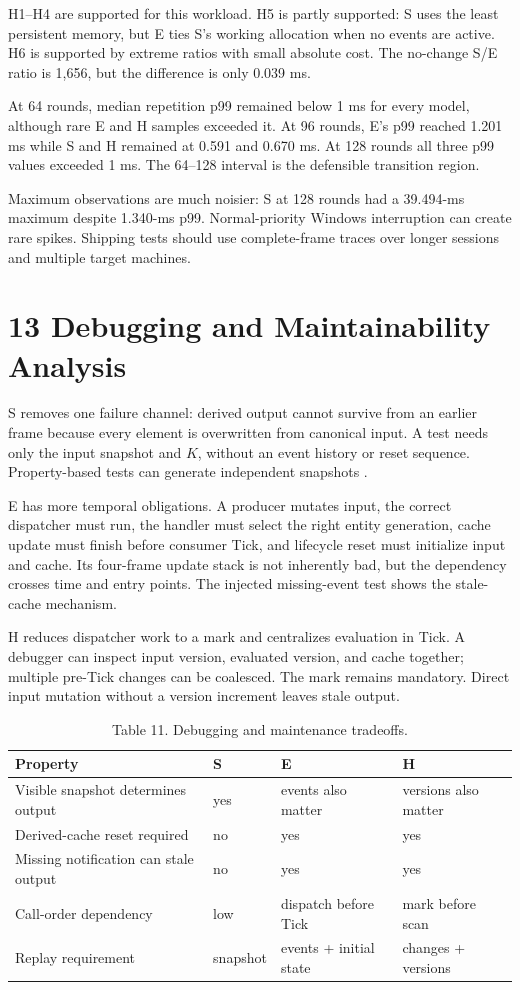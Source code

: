 H1--H4 are supported for this workload. H5 is partly supported: S uses the least persistent memory, but E ties S's working allocation when no events are active. H6 is supported by extreme ratios with small absolute cost. The no-change S/E ratio is 1,656, but the difference is only 0.039 ms.

At 64 rounds, median repetition p99 remained below 1 ms for every model, although rare E and H samples exceeded it. At 96 rounds, E's p99 reached 1.201 ms while S and H remained at 0.591 and 0.670 ms. At 128 rounds all three p99 values exceeded 1 ms. The 64--128 interval is the defensible transition region.

Maximum observations are much noisier: S at 128 rounds had a 39.494-ms maximum despite 1.340-ms p99. Normal-priority Windows interruption can create rare spikes. Shipping tests should use complete-frame traces over longer sessions and multiple target machines.

\section{13 Debugging and Maintainability Analysis}

S removes one failure channel: derived output cannot survive from an earlier frame because every element is overwritten from canonical input. A test needs only the input snapshot and \(K\), without an event history or reset sequence. Property-based tests can generate independent snapshots \cite{claessen2000}.

E has more temporal obligations. A producer mutates input, the correct dispatcher must run, the handler must select the right entity generation, cache update must finish before consumer Tick, and lifecycle reset must initialize input and cache. Its four-frame update stack is not inherently bad, but the dependency crosses time and entry points. The injected missing-event test shows the stale-cache mechanism.

H reduces dispatcher work to a mark and centralizes evaluation in Tick. A debugger can inspect input version, evaluated version, and cache together; multiple pre-Tick changes can be coalesced. The mark remains mandatory. Direct input mutation without a version increment leaves stale output.

\begin{table}
\caption{Table 11. Debugging and maintenance tradeoffs.}
\begin{tabular}{llll}
Property & S & E & H \\
\hline
Visible snapshot determines output & yes & events also matter & versions also matter \\
Derived-cache reset required & no & yes & yes \\
Missing notification can stale output & no & yes & yes \\
Call-order dependency & low & dispatch before Tick & mark before scan \\
Replay requirement & snapshot & events + initial state & changes + versions \\
\end{tabular}
\end{table}

